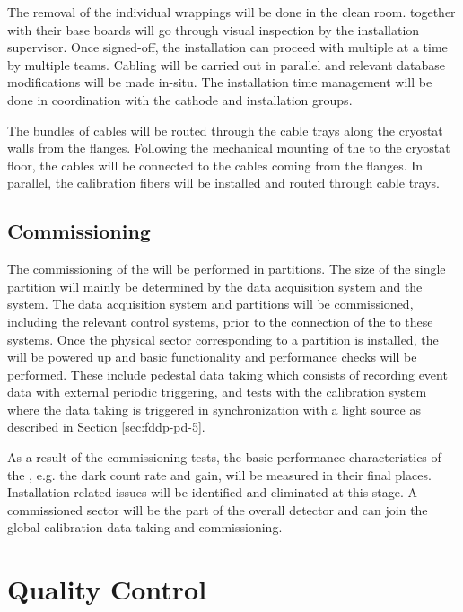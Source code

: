 The removal of the individual  wrappings will be done in the clean room.  together with their base boards will go through visual inspection by the  installation supervisor. Once signed-off, the installation can proceed with multiple  at a time by multiple teams. Cabling will be carried out in parallel and relevant database modifications will be made in-situ. The installation time management will be done in coordination with the cathode and  installation groups.

The bundles of cables will be routed through the cable trays along the cryostat walls from the  flanges. Following the mechanical mounting of the  to the cryostat floor, the  cables will be 
connected to the cables coming from the flanges. In parallel, the calibration fibers will be installed and routed through cable trays.

\subsection{Commissioning}
\label{sec:fddp-pd-9.4}

The commissioning of the  will be performed in partitions. The size of the single partition will mainly be determined by the data acquisition system and the  system. The data acquisition system and  partitions will be commissioned, including the relevant control systems, prior to the connection of the  to these systems. Once the physical sector corresponding to a partition is installed, the  will be powered up and basic functionality and performance checks will be performed. These include pedestal data taking which consists of recording event data with external periodic triggering, and tests with the calibration system where the data taking is triggered in synchronization with a light source as described in Section \ref{sec:fddp-pd-5}.

As a result of the commissioning tests, the basic performance characteristics of the , e.g. the dark count rate and gain, will be measured in their final places. Installation-related issues will be identified and eliminated at this stage. A commissioned sector will be the part of the overall detector and can join the global calibration data taking and commissioning.

\section{Quality Control}
\label{sec:fddp-pd-10}


